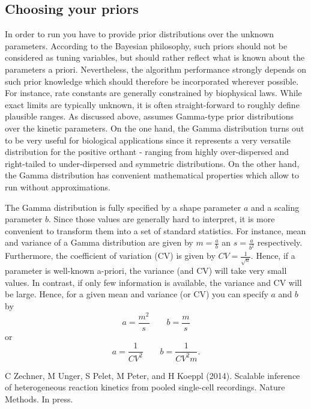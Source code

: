 \documentclass[a4paper, 9pt]{scrartcl}
\begin{document}
\subsection{Choosing your priors} \label{sec:Priors} In order to run \DPP you have to provide prior distributions over the unknown parameters. According to the Bayesian philosophy, such priors should not be considered as tuning variables, but should rather reflect what is known about the parameters a priori. Nevertheless, the algorithm performance strongly depends on such prior knowledge which should therefore be incorporated wherever possible. For instance, rate constants are generally constrained by biophysical laws. While exact limits are typically unknown, it is often straight-forward to roughly define plausible ranges. As discussed above, \DPP assumes Gamma-type prior distributions over the kinetic parameters. On the one hand, the Gamma distribution turns out to be very useful for biological applications since it represents a very versatile distribution for the positive orthant -  ranging from highly over-dispersed and right-tailed to under-dispersed and symmetric distributions. On the other hand, the Gamma distribution has convenient mathematical properties which allow to run \DPP without approximations.

The Gamma distribution is fully specified by a shape parameter $a$ and a scaling parameter $b$. Since those values are generally hard to interpret, it is more convenient to transform them into a set of standard statistics. For instance, mean and variance of a Gamma distribution are given by $m = \frac{a}{b}$ an $s = \frac{a}{b^{2}}$ respectively. Furthermore, the coefficient of variation (CV) is given by $CV=\frac{1}{\sqrt{a}}$. Hence, if a parameter is well-known a-priori, the variance (and CV) will take very small values. In contrast, if only few information is available, the variance and CV will be large. Hence, for a given mean and variance (or CV) you can specify $a$ and $b$ by 
\begin{equation}
	a = \frac{m^2}{s} \quad\quad b =\frac{m}{s}
\end{equation}
or 
\begin{equation}
	a = \frac{1}{CV^2} \quad \quad  b = \frac{1}{CV^2 m}.
\end{equation}

{\footnotesize
\begin{thebibliography}{1}

C Zechner, M Unger, S Pelet, M Peter, and H
  Koeppl (2014).
\newblock Scalable inference of heterogeneous reaction kinetics from pooled single-cell recordings.
\newblock Nature Methods.
\newblock In press.

\end{thebibliography}}
\end{document}
